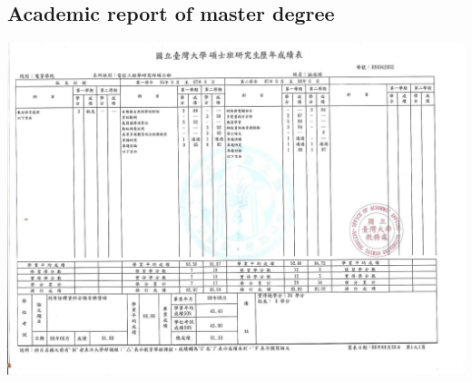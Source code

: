 \documentclass{res}
\begin{document}
\begin{CJK}{UTF8}{bsmi}
\begin{resume}
\newpage
	\section{Academic report of master degree}
	\vspace{0.3in}
	\includegraphics[angle=90,width=\textwidth]{copy1078.jpg}

\end{resume}
\end{CJK}
\end{document}
